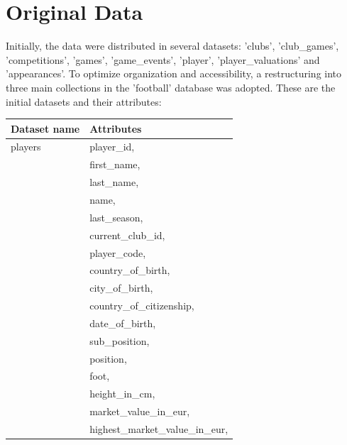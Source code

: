 \documentclass{Configuration_Files/PoliMi3i_thesis}
\begin{document}
\section{Original Data}
Initially, the data were distributed in several datasets: 'clubs', 'club\_games', 'competitions', 'games', 'game\_events', 'player', 'player\_valuations' and 'appearances'. To optimize organization and accessibility, a restructuring into three main collections in the 'football' database was adopted. These are the initial datasets and their attributes:
\begin{tabular}{|l|p{13cm}|}
	\hline
	\textbf{Dataset name} & \textbf{Attributes}                       \\
	\hline
	players
	                      & player\_id,                               \\
	                      & first\_name,                              \\
	                      & last\_name,                               \\
	                      & name,                                     \\
	                      & last\_season,                             \\
	                      & current\_club\_id,                        \\
	                      & player\_code,                             \\
	                      & country\_of\_birth,                       \\
	                      & city\_of\_birth,                          \\
	                      & country\_of\_citizenship,                 \\
	                      & date\_of\_birth,                          \\
	                      & sub\_position,                            \\
	                      & position,                                 \\
	                      & foot,                                     \\
	                      & height\_in\_cm,                           \\
	                      & market\_value\_in\_eur,                   \\
	                      & highest\_market\_value\_in\_eur,          \\

\end{tabular}
\end{document}
